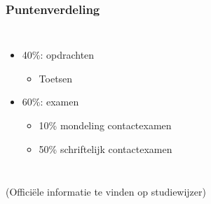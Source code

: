 \documentclass{../khlslides}
\newcommand{\segpie}[4][]{
  {
    \newcommand{\segment}[3][]{
      {
        \pgfkeys{/mylib/segpie/inner radius/.get=\innerradius}
        \pgfkeys{/mylib/segpie/outer radius/.get=\outerradius}
        \pgfkeys{/mylib/segpie/fill/.get=\fill}
        \pgfmathparse{##2/##3*360}\let\fromangle\pgfmathresult
        \pgfmathparse{(##2+1)/##3*360}\let\toangle\pgfmathresult
        \draw[thin,fill=\fill] (\fromangle:\innerradius) --
                               (\fromangle:\outerradius) --
                               (\toangle:\outerradius) --
                               (\toangle:\innerradius) --
                               cycle;
      }
    }
    \pgfkeys{/mylib/segpie/.cd,#1}
    \foreach \idx in {#2,...,#3} {\segment{\idx}{#4}};
  }
}
\begin{document}
\begin{frame}
  \frametitle{Puntenverdeling}
  \begin{columns}
    \begin{itemize}
      \item {\color{red} 40\%: opdrachten}
             \begin{itemize}
               \item {\color{red} Toetsen}
             \end{itemize}
             \vskip4mm
      \item {\color{blue} 60\%: examen}
             \begin{itemize}
               \item {\color{blue} 10\% mondeling contactexamen}
               \item {\color{blue} 50\% schriftelijk contactexamen}
             \end{itemize}
    \end{itemize}
    \begin{center}
    \end{center}
  \end{columns}
  \vskip5mm
  {\tiny (Offici\"ele informatie te vinden op studiewijzer)}
\end{frame}
\end{document}
